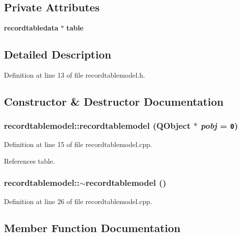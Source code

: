 \subsection*{Private Attributes}
\begin{CompactItemize}
\item 
{\bf recordtabledata} $\ast$ {\bf table}
\end{CompactItemize}


\subsection{Detailed Description}




Definition at line 13 of file recordtablemodel.h.

\subsection{Constructor \& Destructor Documentation}
\subsubsection{\setlength{\rightskip}{0pt plus 5cm}recordtablemodel::recordtablemodel (QObject $\ast$ {\em pobj} = {\tt 0})}\label{classrecordtablemodel_af0c25137468c24be205b42cb34baae4}




Definition at line 15 of file recordtablemodel.cpp.

References table.
\subsubsection{\setlength{\rightskip}{0pt plus 5cm}recordtablemodel::$\sim$recordtablemodel ()}\label{classrecordtablemodel_83350f16ce086e94a8e122801dde199f}




Definition at line 26 of file recordtablemodel.cpp.

\subsection{Member Function Documentation}
